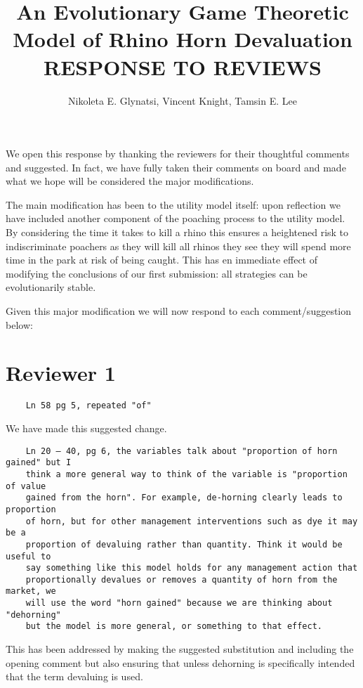\documentclass[10pt]{article}
\title{An Evolutionary Game Theoretic Model of Rhino Horn Devaluation RESPONSE
       TO REVIEWS}
\author{Nikoleta E. Glynatsi, Vincent Knight, Tamsin E. Lee} %
\begin{document}
We open this response by thanking the reviewers for their thoughtful comments
and suggested. In fact, we have fully taken their comments on board and
made what we hope will be considered the major modifications.

The main modification has been to the utility model itself: upon reflection we
have included another component of the poaching process to the utility model. By
considering the time it takes to kill a rhino this ensures a heightened risk to
indiscriminate poachers as they will kill all rhinos they see they will spend
more time in the park at risk of being caught. This has en immediate effect of
modifying the conclusions of our first submission: all strategies can
be evolutionarily stable.

Given this major modification we will now respond to each comment/suggestion
below:


\section{Reviewer 1}

\begin{verbatim}
    Ln 58 pg 5, repeated "of"
\end{verbatim}

We have made this suggested change.

\begin{verbatim}
    Ln 20 – 40, pg 6, the variables talk about "proportion of horn gained" but I
    think a more general way to think of the variable is "proportion of value
    gained from the horn". For example, de-horning clearly leads to proportion
    of horn, but for other management interventions such as dye it may be a
    proportion of devaluing rather than quantity. Think it would be useful to
    say something like this model holds for any management action that
    proportionally devalues or removes a quantity of horn from the market, we
    will use the word "horn gained" because we are thinking about "dehorning"
    but the model is more general, or something to that effect.
\end{verbatim}

This has been addressed by making the suggested substitution and including the
opening comment but also ensuring
that unless dehorning is specifically intended that the term devaluing is used.
\end{document}
